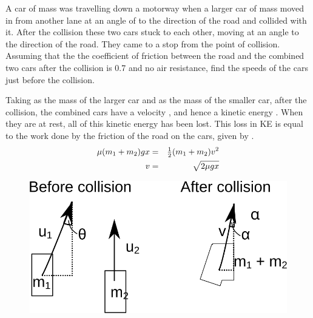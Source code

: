 
\begin{problem} 
{A car of mass  was travelling down a motorway when a larger car of mass  moved in from another lane at an angle of  to the direction of the road and collided with it. After the collision these two cars stuck to each other, moving at an angle  to the direction of the road. They came to a stop  from the point of collision. Assuming that the the coefficient of friction between the road and the combined two cars after the collision is 0.7 and no air resistance, find the speeds of the  cars just before the collision.
}
{}
{Taking  as the mass of the larger car and  as the mass of the smaller car, after the collision, the combined cars have a velocity , and hence a kinetic energy . When they are at rest, all of this kinetic energy has been lost. This loss in KE is equal to the work done by the friction of the road on the cars, given by .
\begin{eqnarray} 
\mu (m_1+m_2)gx &=& {\textstyle \frac{1}{2}} (m_1+m_2) v^2 \\
v &=& \sqrt{2 \mu gx} 
\end{eqnarray}

\begin{figure}[h]
\centering
\includegraphics[width=1.0\textwidth]{../../../figures/dynamics_l6_car_collision.svg}
\caption{}\label{fig:dynamics_l6_car_collision}
\end{figure}


}
\end{problem}
